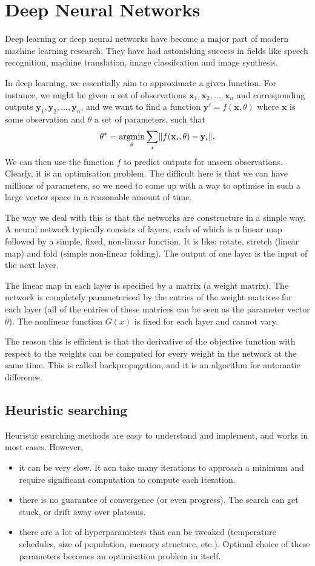 \documentclass[a4paper, openany]{memoir}
\begin{document}
\section{Deep Neural Networks}
Deep learning or deep neural networks have become a major part of modern machine learning research. They have had astonishing success in fields like speech recognition, machine translation, image classifcation and image synthesis.

In deep learning, we essentially aim to approximate a given function. For instance, we might be given a set of observations $\mathbf{x}_1, \mathbf{x}_2, \dots, \mathbf{x}_n$ and corresponding outputs $\mathbf{y}_1, \mathbf{y}_2, \dots, \mathbf{y}_n$, and we want to find a function $\mathbf{y}' = f(\mathbf{x}, \theta)$ where $\mathbf{x}$ is some observation and $\theta$ a set of parameters, such that
\[\theta^* = \operatornamewithlimits{argmin}_\theta \sum_i \lVert f(\mathbf{x}_i, \theta) - \mathbf{y}_i \rVert.\]
We can then use the function $f$ to predict outputs for unseen observations. Clearly, it is an optimisation problem. The difficult here is that we can have millions of parameters, so we need to come up with a way to optimise in such a large vector space in a reasonable amount of time.

The way we deal with this is that the networks are constructure in a simple way. A neural network typically consists of layers, each of which is a linear map followed by a simple, fixed, non-linear function. It is like: rotate, stretch (linear map) and fold (simple non-linear folding). The output of one layer is the input of the next layer.

The linear map in each layer is specified by a matrix (a weight matrix). The network is completely parameterised by the entries of the weight matrices for each layer (all of the entries of these matrices can be seen as the parameter vector $\theta$). The nonlinear function $G(x)$ is fixed for each layer and cannot vary.

The reason this is efficient is that the derivative of the objective function with respect to the weights can be computed for every weight in the network at the same time. This is called backpropagation, and it is an algorithm for automatic difference.

\subsection{Heuristic searching}
Heuristic searching methods are easy to understand and implement, and works in most cases. However,
\begin{itemize}
    \item it can be very slow. It acn take many iterations to approach a minimum and require significant computation to compute each iteration.
    \item there is no guarantee of convergence (or even progress). The search can get stuck, or drift away over plateaus.
    \item there are a lot of hyperparameters that can be tweaked (temperature schedules, size of population, memory structure, etc.). Optimal choice of these parameters becomes an optimisation problem in itself.
\end{itemize}
\end{document}
